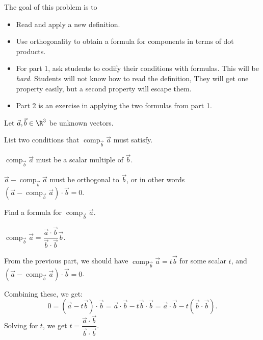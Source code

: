 \documentclass{problemset}
\DeclareMathOperator{\Comp}{comp}
\begin{document}
	\question
	\begin{annotation}
		\begin{goals}

			The goal of this problem is to
			\begin{itemize}
				\item Read and apply a new definition.
				\item Use orthogonality to obtain a formula for components in terms of
					dot products.
			\end{itemize}
		\end{goals}

		\begin{notes}
			\begin{itemize}
				\item For part 1, ask students to codify their conditions
					with formulas. This will be \emph{hard}. Students
					will not know how to read the definition, They will
					get one property easily, but a second property will escape them.
				\item Part 2 is an exercise in applying the two formulas from part 1.
			\end{itemize}
		\end{notes}
	\end{annotation}
	Let $\vec a,\vec b\in \R^3$ be unknown vectors.
	\begin{parts}
		\item List two conditions that $\Comp_{\vec b}\vec a$ must satisfy.
			\begin{solution}
				$\Comp_{\vec b} \vec a$ must be a scalar multiple of $\vec b$.

				$\vec a - \Comp_{\vec b} \vec a$ must be orthogonal to $\vec b$,
				or in other words $(\vec a-\Comp_{\vec b}\vec a)\cdot \vec b=0$.
			\end{solution}
		\item Find a formula for $\Comp_{\vec b}\vec a$.
			\begin{solution}
				$\Comp_{\vec b}\vec a = \dfrac{\vec a\cdot\vec b}{\vec b\cdot\vec b} \vec b$.

				From the previous part, we should have $\Comp_{\vec b}\vec a=t\vec b$
				for some scalar $t$, and $(\vec a-\Comp_{\vec b}\vec a)\cdot \vec b=0$.

				Combining these, we get:
				\[
					0=(\vec a-t \vec b)\cdot \vec b
					=\vec a\cdot\vec b - t\vec b\cdot\vec b
					=\vec a\cdot\vec b - t(\vec b\cdot\vec b).
				\]
				Solving for $t$, we get $t = \dfrac{\vec a\cdot\vec b}{\vec b\cdot\vec b}$.
			\end{solution}
	\end{parts}
\end{document}
